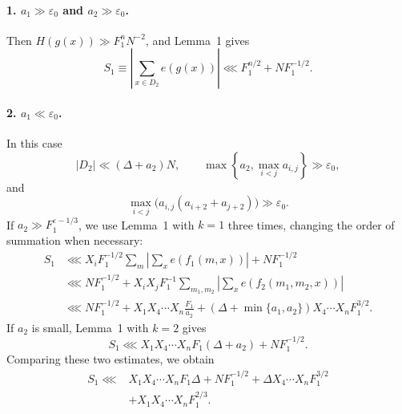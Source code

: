 \documentclass[10pt]{article}
\begin{document}
\paragraph{1. $a_1\gg\varepsilon_0$ and $a_2\gg\varepsilon_0$.}
Then $H(g(x))\gg F_1^nN^{-2}$, and Lemma~1 gives
\[
  S_1\equiv\left|\sum_{x\in D_2}e(g(x))\right|
  \lll F_1^{n/2}+NF_1^{-1/2}.
\]

\paragraph{2. $a_1\ll\varepsilon_0$.}
In this case
\[
  |D_2|\ll(\Delta+a_2)N,
  \qquad \max\left\{a_2,\max_{i<j}a_{i,j}\right\}\gg\varepsilon_0,
\]
and
\[
  \max_{i<j}\bigl(a_{i,j}(a_{i+2}+a_{j+2})\bigr)\gg\varepsilon_0.
\]
If $a_2\gg F_1^{\varepsilon-1/3}$, we use Lemma~1 with $k=1$ three times, changing the order of summation when necessary:
\[
\begin{aligned}
  S_1
  &\lll X_iF_1^{-1/2}\sum_m
      \left|\sum_xe(f_1(m,x))\right|+NF_1^{-1/2}\\
  &\lll NF_1^{-1/2}+X_iX_jF_1^{-1}
      \sum_{m_1,m_2}\left|\sum_xe(f_2(m_1,m_2,x))\right|\\
  &\lll NF_1^{-1/2}
      +X_1X_4\cdots X_n\frac{F_1}{a_2}
      +(\Delta+\min\{a_1,a_2\})X_4\cdots X_nF_1^{3/2}.
\end{aligned}
\]
If $a_2$ is small, Lemma~1 with $k=2$ gives
\[
  S_1\lll X_1X_4\cdots X_nF_1(\Delta+a_2)+NF_1^{-1/2}.
\]
Comparing these two estimates, we obtain
\[
\begin{aligned}
  S_1\lll{}&X_1X_4\cdots X_nF_1\Delta+NF_1^{-1/2}
  +\Delta X_4\cdots X_nF_1^{3/2}\\
  &+X_1X_4\cdots X_nF_1^{2/3}.
\end{aligned}
\]
\end{document}
